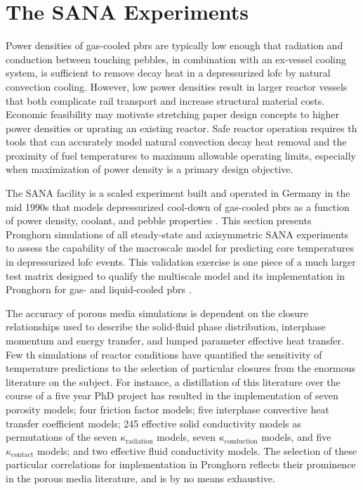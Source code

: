 \chapter{The SANA Experiments}
\label{sec:sana}

Power densities of gas-cooled \glspl{pbr} are typically low enough that radiation and conduction between touching pebbles, in combination with an ex-vessel cooling system, is sufficient to remove decay heat in a depressurized \gls{lofc} by natural convection cooling. However, low power densities result in larger reactor vessels that both complicate rail transport and increase structural material costs. Economic feasibility may motivate stretching paper design concepts to higher power densities or uprating an existing reactor. Safe reactor operation requires \gls{th} tools that can accurately model natural convection decay heat removal and the proximity of fuel temperatures to maximum allowable operating limits, especially when maximization of power density is a primary design objective. 


The SANA facility is a scaled experiment built and operated in Germany in the mid 1990s that models depressurized cool-down of gas-cooled \glspl{pbr} as a function of power density, coolant, and pebble properties \cite{SANA}. This section presents Pronghorn simulations of all steady-state and axisymmetric SANA experiments to assess the capability of the macroscale model for predicting core temperatures in depressurized \gls{lofc} events. This validation exercise is one piece of a much larger test matrix designed to qualify the multiscale model and its implementation in Pronghorn for gas- and liquid-cooled \glspl{pbr} \cite{ph_plan}.

The accuracy of porous media simulations is dependent on the closure relationships used to describe the solid-fluid phase distribution, interphase momentum and energy transfer, and lumped parameter effective heat transfer. Few \gls{th} simulations of reactor conditions have quantified the sensitivity of temperature predictions to the selection of particular closures from the enormous literature on the subject. For instance, a distillation of this literature over the course of a five year PhD project has resulted in the implementation of seven porosity models; four friction factor models; five interphase convective heat transfer coefficient models; 245 effective solid conductivity models as permutations of the seven \(\kappa_\text{radiation}\) models, seven \(\kappa_\text{conduction}\) models, and five \(\kappa_\text{contact}\) models; and two effective fluid conductivity models. The selection of these particular correlations for implementation in Pronghorn reflects their prominence in the porous media literature, and is by no means exhaustive. 

